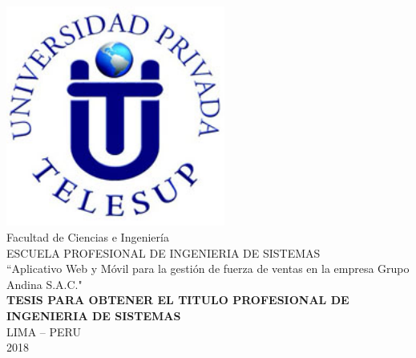 \begin{center}	
\includegraphics[width=7.2cm]{UPTLogo.jpg} \\[1 cm]
\huge Facultad de Ciencias e Ingeniería \\[0.5 cm]
\Large ESCUELA PROFESIONAL DE INGENIERIA DE SISTEMAS\\[1 cm]
\Large ``Aplicativo Web y Móvil para la gestión de fuerza de ventas en la empresa Grupo Andina S.A.C."\\[1 cm]
\Large \textbf{TESIS PARA OBTENER  EL TITULO PROFESIONAL DE INGENIERIA DE SISTEMAS}\\[0.5 cm]
\large LIMA – PERU\\
\large 2018
\end{center}